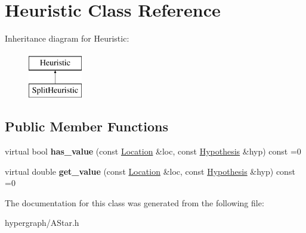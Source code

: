 \hypertarget{classHeuristic}{
\section{Heuristic Class Reference}
\label{classHeuristic}
}
Inheritance diagram for Heuristic:\begin{figure}[H]
\begin{center}
\leavevmode
\includegraphics[height=2cm]{classHeuristic}
\end{center}
\end{figure}
\subsection*{Public Member Functions}
\begin{DoxyCompactItemize}
\item 
\hypertarget{classHeuristic_a6bd92dacd8fe6aece51e6c2abecf6dd0}{
virtual bool {\bfseries has\_\-value} (const \hyperlink{structLocation}{Location} \&loc, const \hyperlink{structHypothesis}{Hypothesis} \&hyp) const =0}
\label{classHeuristic_a6bd92dacd8fe6aece51e6c2abecf6dd0}

\item 
\hypertarget{classHeuristic_a4e12169efe1bd4323dba387ac94a4248}{
virtual double {\bfseries get\_\-value} (const \hyperlink{structLocation}{Location} \&loc, const \hyperlink{structHypothesis}{Hypothesis} \&hyp) const =0}
\label{classHeuristic_a4e12169efe1bd4323dba387ac94a4248}

\end{DoxyCompactItemize}


The documentation for this class was generated from the following file:\begin{DoxyCompactItemize}
\item 
hypergraph/AStar.h\end{DoxyCompactItemize}
